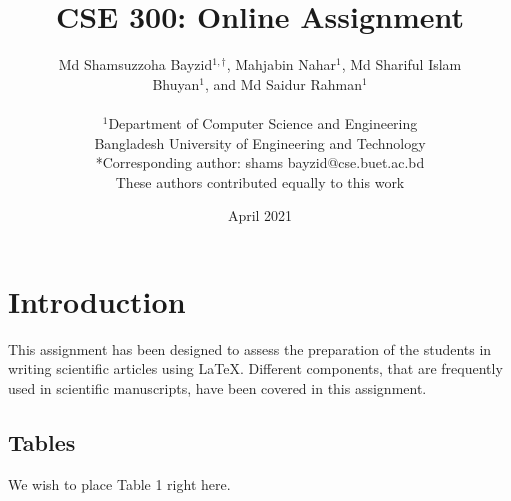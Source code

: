 \documentclass[12pt, a4paper]{article} %
\title{CSE 300: Online Assignment}
\author{Md Shamsuzzoha Bayzid$^{1,\dagger}$, Mahjabin Nahar$^{1}$, Md Shariful Islam\\ Bhuyan$^{1}$, and Md Saidur Rahman$^{1}$ \\ \\
	$^1$Department of Computer Science and Engineering \\
	Bangladesh University of Engineering and Technology \\
	*Corresponding author: shams bayzid@cse.buet.ac.bd \\
	These authors contributed equally to this work
}
\date{April 2021}
\begin{document}
	\maketitle
	
	\section{Introduction}
	This assignment has been designed to assess the preparation of the students in writing	scientific articles using \LaTeX. Different components, that are frequently used in scientific manuscripts, have been covered in this assignment.
	
	
	\subsection{Tables}
	We wish to place Table 1 right here.
	
\end{document}
